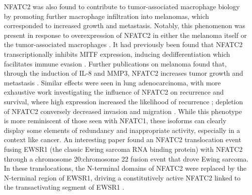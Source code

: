 NFATC2 was also found to contribute to tumor-associated macrophage biology by promoting further macrophage infiltration into melanomas, which corresponded to increased growth and metastasis. Notably, this phenomenon was present in response to overexpression of NFATC2 in either the melanoma itself or the tumor-associated macrophages \citep{Liu2018}. It had previously been found that NFATC2 transcriptionally inhibits MITF expression, inducing dedifferentiation which facilitates immune evasion \citep{Perotti2016}. Further publications on melanoma found that, through the induction of IL-8 and MMP3, NFATC2 increases tumor growth and metastasis \citep{Shoshan2016}. Similar effects were seen in lung adenocarcinoma, with more exhaustive work investigating the influence of NFATC2 on recurrence and survival, where high expression increased the likelihood of recurrence \citep{Xiao2017}; depletion of NFATC2 conversely decreased invasion and migration \citep{Liu2013}. While this phenotype is more reminiscent of those seen with NFATC1, these isoforms can clearly display some elements of redundancy and inappropriate activity, especially in a context like cancer. An interesting paper found an NFATC2 translocation event fusing EWSR1 (the classic Ewing sarcoma RNA binding protein) with NFATC2 through a chromosome 20:chromosome 22 fusion event that drove Ewing sarcoma. In these translocations, the N-terminal domains of NFATC2 were replaced by the N-terminal region of EWSR1, driving a constitutively active NFATC2 linked to the transactivating segment of EWSR1 \citep{Szuhai2009}. 

